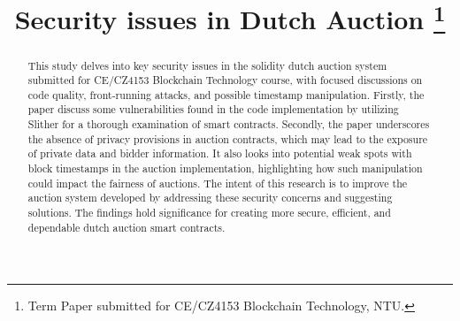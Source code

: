 \documentclass[conference]{IEEEtran}
\begin{document}
\title{{Security issues in Dutch Auction}
\thanks{Term Paper submitted for CE/CZ4153 Blockchain Technology, NTU.}
}

\author{
\and
{}
\and
{}
}

\maketitle

\begin{abstract}
This study delves into key security issues in the solidity dutch auction system submitted for CE/CZ4153 Blockchain Technology course, with focused discussions on code quality, front-running attacks, and possible timestamp manipulation. Firstly, the paper discuss some vulnerabilities found in the code implementation by  utilizing Slither for a thorough examination of smart contracts. Secondly, the paper underscores the absence of privacy provisions in auction contracts, which may lead to the exposure of private data and bidder information. It also looks into potential weak spots with block timestamps in the auction implementation, highlighting how such manipulation could impact the fairness of auctions. The intent of this research is to improve the auction system developed by addressing these security concerns and suggesting solutions. The findings hold significance for creating more secure, efficient, and dependable dutch auction smart contracts.

\end{abstract}
\end{document}
